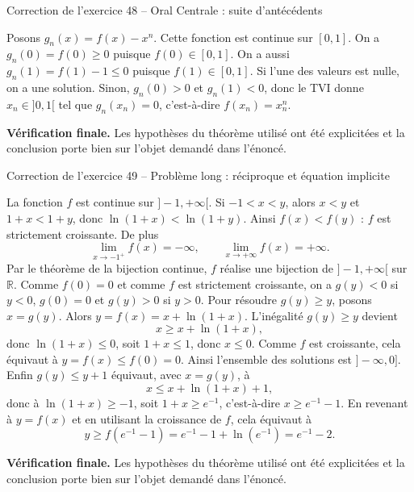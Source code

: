\documentclass[11pt,a4paper]{article}
\newcommand{\R}{\mathbb{R}}
\begin{document}
\begin{corrbox}{Correction de l'exercice 48 -- Oral Centrale : suite d'antécédents}

Posons $g_n(x)=f(x)-x^n$. Cette fonction est continue sur $[0,1]$. On a $g_n(0)=f(0)\geq0$ puisque $f(0)\in[0,1]$. On a aussi $g_n(1)=f(1)-1\leq0$ puisque $f(1)\in[0,1]$. Si l'une des valeurs est nulle, on a une solution. Sinon, $g_n(0)>0$ et $g_n(1)<0$, donc le TVI donne $x_n\in]0,1[$ tel que $g_n(x_n)=0$, c'est-à-dire $f(x_n)=x_n^n$.

\medskip
\textbf{Vérification finale.} Les hypothèses du théorème utilisé ont été explicitées et la conclusion porte bien sur l'objet demandé dans l'énoncé.
\end{corrbox}


\begin{corrbox}{Correction de l'exercice 49 -- Problème long : réciproque et équation implicite}

La fonction $f$ est continue sur $]-1,+\infty[$. Si $-1<x<y$, alors $x<y$ et $1+x<1+y$, donc $\ln(1+x)<\ln(1+y)$. Ainsi $f(x)<f(y)$ : $f$ est strictement croissante. De plus
\[
\lim_{x\to-1^+}f(x)=-\infty,\qquad \lim_{x\to+\infty}f(x)=+\infty.
\]
Par le théorème de la bijection continue, $f$ réalise une bijection de $]-1,+\infty[$ sur $\R$.
Comme $f(0)=0$ et comme $f$ est strictement croissante, on a $g(y)<0$ si $y<0$, $g(0)=0$ et $g(y)>0$ si $y>0$.
Pour résoudre $g(y)\geq y$, posons $x=g(y)$. Alors $y=f(x)=x+\ln(1+x)$. L'inégalité $g(y)\geq y$ devient
\[
x\geq x+\ln(1+x),
\]
donc $\ln(1+x)\leq0$, soit $1+x\leq1$, donc $x\leq0$. Comme $f$ est croissante, cela équivaut à $y=f(x)\leq f(0)=0$. Ainsi l'ensemble des solutions est $]-\infty,0]$.
Enfin $g(y)\leq y+1$ équivaut, avec $x=g(y)$, à
\[
x\leq x+\ln(1+x)+1,
\]
donc à $\ln(1+x)\geq-1$, soit $1+x\geq e^{-1}$, c'est-à-dire $x\geq e^{-1}-1$. En revenant à $y=f(x)$ et en utilisant la croissance de $f$, cela équivaut à
\[
y\geq f(e^{-1}-1)=e^{-1}-1+\ln(e^{-1})=e^{-1}-2.
\]

\medskip
\textbf{Vérification finale.} Les hypothèses du théorème utilisé ont été explicitées et la conclusion porte bien sur l'objet demandé dans l'énoncé.
\end{corrbox}
\end{document}
